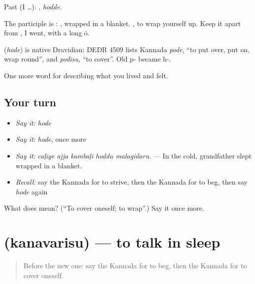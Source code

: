 Past (I …): , \emph{hodde}.

The participle is :  , wrapped in a blanket. , to wrap yourself up. Keep it apart from , I went, with a long ō.

\begin{cousinweb}
\textbf{} (\emph{hode}) is native Dravidian: DEDR 4509 lists Kannada \emph{pode}, \textquotedblleft{}to put over, put on, wrap round\textquotedblright{}, and \emph{podisu}, \textquotedblleft{}to cover\textquotedblright{}. Old p- became h-.
\end{cousinweb}

\begin{grammarlens}[title={What you've built}]
One more word for describing what you lived and felt.
\end{grammarlens}

\subsection*{Your turn}
\begin{itemize}
\raggedright
  \item \emph{Say it:} \emph{hode}
  \item \emph{Say it:} \emph{hode}, once more
  \item \emph{Say it:} \emph{caḷige ajja kambaḷi hoddu malagidaru.} — In the cold, grandfather slept wrapped in a blanket.
  \item \emph{Recall:} say the Kannada for to strive, then the Kannada for to beg, then say \emph{hode} again
\end{itemize}

\begin{tcolorbox}[breakable,colback=teal!4,colframe=teal!35!black,title={Before you move on}]
What does  mean? (\textquotedblleft{}To cover oneself; to wrap\textquotedblright{}.) Say it once more.
\end{tcolorbox}
\section[\texorpdfstring{\kn{ಕನವರಿಸು} (kanavarisu)}{ಕನವರಿಸು (kanavarisu)}]{ (kanavarisu) — to talk in sleep}

\label{lesson:KA-C506-kanavarisu}



\begin{quote}
Before the new one: say the Kannada for to beg, then the Kannada for to cover oneself.
\end{quote}

